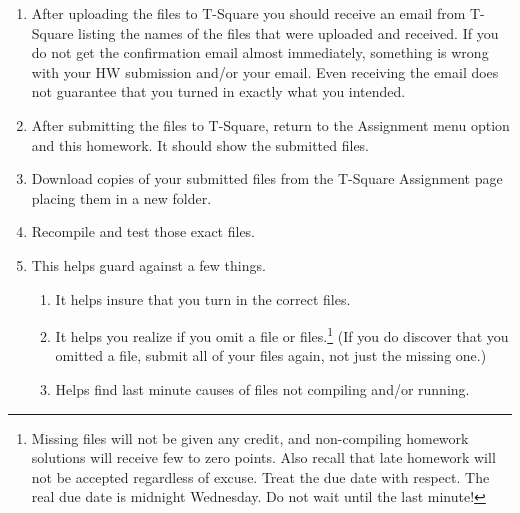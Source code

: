\documentclass[12pt]{article}
\begin{document}
\begin{enumerate}
    \item After uploading the files to T-Square you should receive an email from T-Square listing the names of the files that were uploaded and received. If you do not get the confirmation email almost immediately, something is wrong with your HW submission and/or your email. Even receiving the email does not guarantee that you turned in exactly what you intended.
    \item After submitting the files to T-Square, return to the Assignment menu option and this homework. It should show the submitted files.
    \item Download copies of your submitted files from the T-Square Assignment page placing them in a new folder.
    \item Recompile and test those exact files.
    \item This helps guard against a few things.
    \begin{enumerate}
        \item It helps insure that you turn in the correct files.
        \item It helps you realize if you omit a file or files.\footnote{Missing files will not be given any credit, and non-compiling homework solutions will receive few to zero points. Also recall that late homework will not be accepted regardless of excuse. Treat the due date with respect. The real due date is midnight Wednesday. Do not wait until the last minute!}
        (If you do discover that you omitted a file, submit all of your files again, not just the missing one.)
        \item Helps find last minute causes of files not compiling and/or running.
    \end{enumerate}
\end{enumerate}
\end{document}
